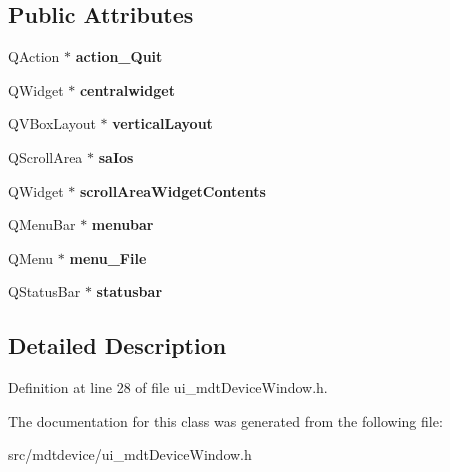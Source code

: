 \subsection*{Public Attributes}
\begin{DoxyCompactItemize}
\item 
\hypertarget{class_ui__mdt_device_window_a9eef553afdbb5add9df9ddf09b46d598}{
QAction $\ast$ {\bfseries action\_\-Quit}}
\label{class_ui__mdt_device_window_a9eef553afdbb5add9df9ddf09b46d598}

\item 
\hypertarget{class_ui__mdt_device_window_ad43c2b08a1dad506369adf975eab9fcd}{
QWidget $\ast$ {\bfseries centralwidget}}
\label{class_ui__mdt_device_window_ad43c2b08a1dad506369adf975eab9fcd}

\item 
\hypertarget{class_ui__mdt_device_window_a93289e261d8474f5c3c627fd98e5618b}{
QVBoxLayout $\ast$ {\bfseries verticalLayout}}
\label{class_ui__mdt_device_window_a93289e261d8474f5c3c627fd98e5618b}

\item 
\hypertarget{class_ui__mdt_device_window_a20450234862772ffcf7d6ca5ba903aa1}{
QScrollArea $\ast$ {\bfseries saIos}}
\label{class_ui__mdt_device_window_a20450234862772ffcf7d6ca5ba903aa1}

\item 
\hypertarget{class_ui__mdt_device_window_a3389de056f2567855e29bc37becf052e}{
QWidget $\ast$ {\bfseries scrollAreaWidgetContents}}
\label{class_ui__mdt_device_window_a3389de056f2567855e29bc37becf052e}

\item 
\hypertarget{class_ui__mdt_device_window_add99fb8eb3acdf89f4f2fca08313e356}{
QMenuBar $\ast$ {\bfseries menubar}}
\label{class_ui__mdt_device_window_add99fb8eb3acdf89f4f2fca08313e356}

\item 
\hypertarget{class_ui__mdt_device_window_a088b11fa8e9aa435204bac4d9ffc466e}{
QMenu $\ast$ {\bfseries menu\_\-File}}
\label{class_ui__mdt_device_window_a088b11fa8e9aa435204bac4d9ffc466e}

\item 
\hypertarget{class_ui__mdt_device_window_a7a212839bf52a75a6a0213fa2fb9a307}{
QStatusBar $\ast$ {\bfseries statusbar}}
\label{class_ui__mdt_device_window_a7a212839bf52a75a6a0213fa2fb9a307}

\end{DoxyCompactItemize}


\subsection{Detailed Description}


Definition at line 28 of file ui\_\-mdtDeviceWindow.h.



The documentation for this class was generated from the following file:\begin{DoxyCompactItemize}
\item 
src/mdtdevice/ui\_\-mdtDeviceWindow.h\end{DoxyCompactItemize}
